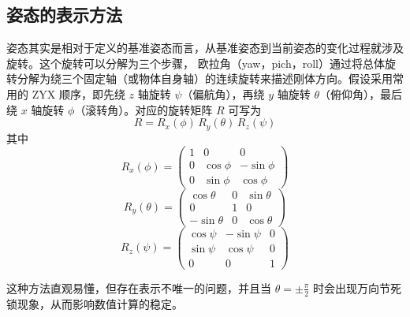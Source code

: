 \subsection{姿态的表示方法}
姿态其实是相对于定义的基准姿态而言，从基准姿态到当前姿态的变化过程就涉及旋转。这个旋转可以分解为三个步骤，
欧拉角（yaw，pich，roll）通过将总体旋转分解为绕三个固定轴（或物体自身轴）的连续旋转来描述刚体方向。假设采用常用的 ZYX 顺序，即先绕 $z$ 轴旋转 $\psi$（偏航角），再绕 $y$ 轴旋转 $\theta$（俯仰角），最后绕 $x$ 轴旋转 $\phi$（滚转角）。对应的旋转矩阵 $R$ 可写为
\begin{equation}
	R = R_x(\phi) \, R_y(\theta) \, R_z(\psi)
\end{equation}
其中
\begin{equation}
	R_x(\phi) = \begin{pmatrix}
		1 & 0 & 0 \\
		0 & \cos\phi & -\sin\phi \\
		0 & \sin\phi & \cos\phi
	\end{pmatrix}
\end{equation}
\begin{equation}
	R_y(\theta) = \begin{pmatrix}
		\cos\theta & 0 & \sin\theta \\
		0 & 1 & 0 \\
		-\sin\theta & 0 & \cos\theta
	\end{pmatrix}
\end{equation}
\begin{equation}
	R_z(\psi) = \begin{pmatrix}
		\cos\psi & -\sin\psi & 0 \\
		\sin\psi & \cos\psi & 0 \\
		0 & 0 & 1
	\end{pmatrix}
\end{equation}

这种方法直观易懂，但存在表示不唯一的问题，并且当 $\theta = \pm \frac{\pi}{2}$ 时会出现万向节死锁现象，从而影响数值计算的稳定。


